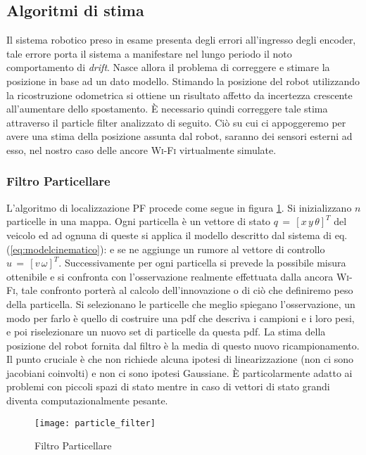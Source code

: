 \subsection{Algoritmi di stima}
Il sistema robotico preso in esame presenta degli errori all'ingresso degli
encoder, tale errore porta il sistema a manifestare nel lungo periodo il noto
comportamento di \emph{drift}.
Nasce allora il problema di correggere e stimare la posizione in base ad un dato
modello.
Stimando la posizione del robot utilizzando la ricostruzione odometrica si
ottiene un risultato affetto da incertezza crescente all'aumentare dello
spostamento.
È necessario quindi correggere tale stima attraverso il particle
filter\cite{newman2003} analizzato di seguito.
Ciò su cui ci appoggeremo per avere una stima della posizione assunta dal robot,
saranno dei sensori esterni ad esso, nel nostro caso delle ancore \textsc{Wi-Fi}
virtualmente simulate.

\subsubsection{Filtro Particellare}
L'algoritmo di localizzazione PF procede come segue in figura
\ref{fig:particle filter}. Si inizializzano $n$ particelle in una mappa.
Ogni particella è un vettore di stato $q\,=\,[x \, y \, \theta]^{T}$ del veicolo
ed ad ognuna di queste si applica il modello descritto dal sistema di 
eq.(\ref{eq:modelcinematico}): e se ne aggiunge un rumore al vettore di
controllo $u\,=\,[v \, \omega]^{T}$.
Successivamente per ogni particella si prevede la possibile misura ottenibile e
si confronta con l'osservazione realmente effettuata dalla ancora
\textsc{Wi-Fi}, tale confronto porterà al calcolo dell'innovazione o di ciò che
definiremo peso della particella.
Si selezionano le particelle che meglio spiegano l'osservazione, un modo per
farlo è quello di costruire una pdf che descriva i campioni e i loro pesi, e
poi riselezionare un nuovo set di particelle da questa pdf.
La stima della posizione del robot fornita dal filtro è la media di questo
nuovo ricampionamento.
Il punto cruciale è che non richiede alcuna ipotesi di linearizzazione (non ci
sono jacobiani coinvolti) e non ci sono ipotesi Gaussiane. È particolarmente
adatto ai problemi con piccoli spazi di stato mentre in caso di vettori di
stato grandi diventa computazionalmente pesante.

\begin{figure}[!htb]
 \centering
  \texttt{[image: particle\_filter]}
  \caption{Filtro Particellare}
  \label{fig:particle filter}
\end{figure}
